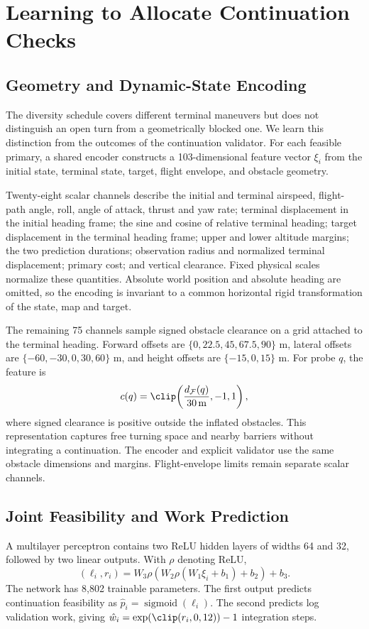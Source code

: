 \section{Learning to Allocate Continuation Checks}
\subsection{Geometry and Dynamic-State Encoding}
The diversity schedule covers different terminal maneuvers but does not distinguish an open turn from a geometrically blocked one. We learn this distinction from the outcomes of the continuation validator. For each feasible primary, a shared encoder constructs a 103-dimensional feature vector $\xi_i$ from the initial state, terminal state, target, flight envelope, and obstacle geometry.

Twenty-eight scalar channels describe the initial and terminal airspeed, flight-path angle, roll, angle of attack, thrust and yaw rate; terminal displacement in the initial heading frame; the sine and cosine of relative terminal heading; target displacement in the terminal heading frame; upper and lower altitude margins; the two prediction durations; observation radius and normalized terminal displacement; primary cost; and vertical clearance. Fixed physical scales normalize these quantities. Absolute world position and absolute heading are omitted, so the encoding is invariant to a common horizontal rigid transformation of the state, map and target.

The remaining 75 channels sample signed obstacle clearance on a grid attached to the terminal heading. Forward offsets are $\{0,22.5,45,67.5,90\}$ m, lateral offsets are $\{-60,-30,0,30,60\}$ m, and height offsets are $\{-15,0,15\}$ m. For probe $q$, the feature is
\begin{equation}
 c(q)=\clip\!\left(\frac{d_{\mathcal F}(q)}{30\,{\rm m}},-1,1\right),
\end{equation}
where signed clearance is positive outside the inflated obstacles. This representation captures free turning space and nearby barriers without integrating a continuation. The encoder and explicit validator use the same obstacle dimensions and margins. Flight-envelope limits remain separate scalar channels.

\subsection{Joint Feasibility and Work Prediction}
A multilayer perceptron contains two ReLU hidden layers of widths 64 and 32, followed by two linear outputs. With $\rho$ denoting ReLU,
\begin{equation}
 (\ell_i,r_i)=W_3\rho\!\left(W_2\rho(W_1\xi_i+b_1)+b_2\right)+b_3.
\end{equation}
The network has 8,802 trainable parameters. The first output predicts continuation feasibility as $\hat p_i=\operatorname{sigmoid}(\ell_i)$. The second predicts log validation work, giving $\hat w_i=\exp(\clip(r_i,0,12))-1$ integration steps.


